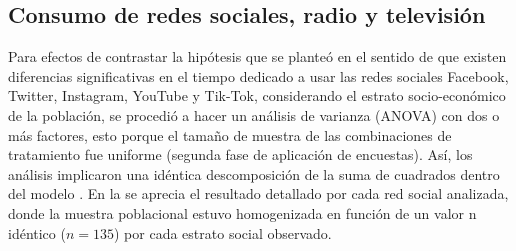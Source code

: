 \documentclass[spanish]{textolivre}
\begin{document}
\subsection{Consumo de redes sociales, radio y televisión}
Para efectos de contrastar la hipótesis que se planteó en el sentido de que existen diferencias significativas en el tiempo dedicado a usar las redes sociales Facebook, Twitter, Instagram, YouTube y Tik-Tok, considerando el estrato socio-económico de la población, se procedió a hacer un análisis de varianza (ANOVA) con dos o más factores, esto porque el tamaño de muestra de las combinaciones de tratamiento fue uniforme (segunda fase de aplicación de encuestas). Así, los análisis implicaron una idéntica descomposición de la suma de cuadrados dentro del modelo \cite{vallejo2010}. En la  se aprecia el resultado detallado por cada red social analizada, donde la muestra poblacional estuvo homogenizada en función de un valor n idéntico ($n = 135$) por cada estrato social observado.
\end{document}
